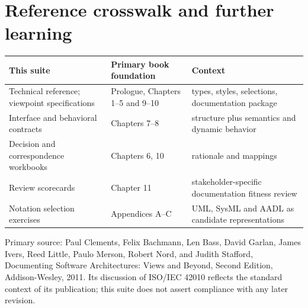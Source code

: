 \documentclass[10pt,letterpaper]{article}
\begin{document}
\section{Reference crosswalk and further learning}
\small
\begin{tabularx}{\linewidth}{@{}YYY@{}}
\toprule
\textbf{This suite} & \textbf{Primary book foundation} & \textbf{Context} \\
\midrule
Technical reference; viewpoint specifications & Prologue, Chapters 1--5 and 9--10 & types, styles, selections, documentation package \\
Interface and behavioral contracts & Chapters 7--8 & structure plus semantics and dynamic behavior \\
Decision and correspondence workbooks & Chapters 6, 10 & rationale and mappings \\
Review scorecards & Chapter 11 & stakeholder-specific documentation fitness review \\
Notation selection exercises & Appendices A--C & UML, SysML and AADL as candidate representations \\
\bottomrule
\end{tabularx}
\normalsize
Primary source: Paul Clements, Felix Bachmann, Len Bass, David Garlan, James Ivers, Reed Little, Paulo Merson, Robert Nord, and Judith Stafford, Documenting Software Architectures: Views and Beyond, Second Edition, Addison-Wesley, 2011. Its discussion of ISO/IEC 42010 reflects the standard context of its publication; this suite does not assert compliance with any later revision.
\end{document}
